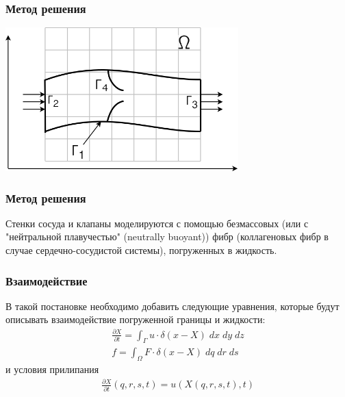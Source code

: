 \documentclass[14pt]{beamer}
\begin{document}
\begin{frame}
\frametitle{Метод решения}
    \begin{center}
        \includegraphics[width=9cm]{area_ibm.png}
    \end{center}
\end{frame}

\begin{frame}
\frametitle{Метод решения}
Стенки сосуда и клапаны моделируются с помощью безмассовых (или с "нейтральной плавучестью" (neutrally buoyant)) фибр (коллагеновых фибр в случае сердечно-сосудистой системы), погруженных в жидкость.
\end{frame}

\begin{frame}
\frametitle{Взаимодействие}
В такой постановке необходимо добавить следующие уравнения, которые будут описывать взаимодействие погруженной границы и жидкости:
\begin{gather}
    \label{eq:ibm_velocity}
    \frac{\partial X}{\partial t} = \int_{\Gamma} u \cdot \delta (x - X)\; dx\; dy\; dz \\
    \label{eq:ibm_force}
    f = \int_{\Omega} F \cdot \delta (x - X)\; dq\; dr\; ds
\end{gather}
и условия прилипания
\begin{gather}
    \label{eq:no_slip}
    \frac{\partial X}{\partial t} (q, r, s, t) = u(X(q, r, s, t), t)
\end{gather}
\end{frame}
\end{document}
